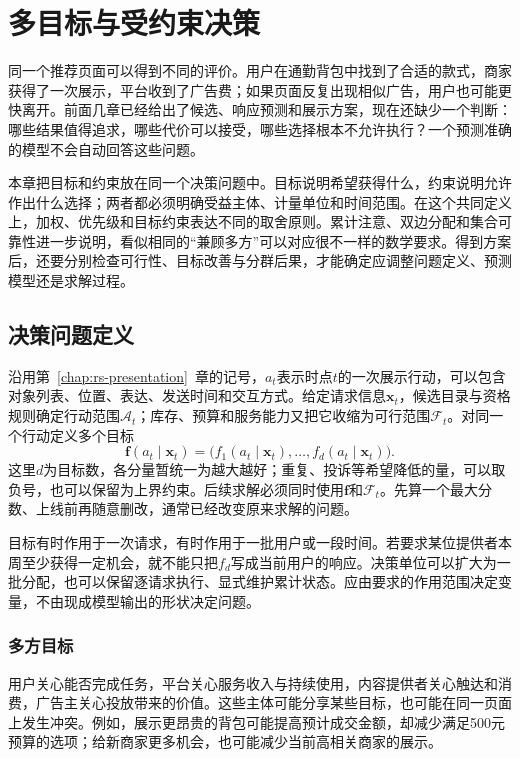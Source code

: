 \chapter{多目标与受约束决策}
\label{chap:rs-constraints}

同一个推荐页面可以得到不同的评价。用户在通勤背包中找到了合适的款式，商家获得了一次展示，平台收到了广告费；如果页面反复出现相似广告，用户也可能更快离开。前面几章已经给出了候选、响应预测和展示方案，现在还缺少一个判断：哪些结果值得追求，哪些代价可以接受，哪些选择根本不允许执行？一个预测准确的模型不会自动回答这些问题。

本章把目标和约束放在同一个决策问题中。目标说明希望获得什么，约束说明允许作出什么选择；两者都必须明确受益主体、计量单位和时间范围。在这个共同定义上，加权、优先级和目标约束表达不同的取舍原则。累计注意、双边分配和集合可靠性进一步说明，看似相同的“兼顾多方”可以对应很不一样的数学要求。得到方案后，还要分别检查可行性、目标改善与分群后果，才能确定应调整问题定义、预测模型还是求解过程。

\section{决策问题定义}
\label{sec:rs-decision-definition}

沿用第~\ref{chap:rs-presentation}~章的记号，$a_t$表示时点$t$的一次展示行动，可以包含对象列表、位置、表达、发送时间和交互方式。给定请求信息$\bm{x}_t$，候选目录与资格规则确定行动范围$\mathcal{A}_t$；库存、预算和服务能力又把它收缩为可行范围$\mathcal{F}_t$。对同一个行动定义多个目标
\[
 \bm{f}(a_t\mid\bm{x}_t)
 =\bigl(f_1(a_t\mid\bm{x}_t),\ldots,
        f_d(a_t\mid\bm{x}_t)\bigr).
\]
这里$d$为目标数，各分量暂统一为越大越好；重复、投诉等希望降低的量，可以取负号，也可以保留为上界约束。后续求解必须同时使用$\bm{f}$和$\mathcal{F}_t$。先算一个最大分数、上线前再随意删改，通常已经改变原来求解的问题。

目标有时作用于一次请求，有时作用于一批用户或一段时间。若要求某位提供者本周至少获得一定机会，就不能只把$f_d$写成当前用户的响应。决策单位可以扩大为一批分配，也可以保留逐请求执行、显式维护累计状态。应由要求的作用范围决定变量，不由现成模型输出的形状决定问题。

\subsection{多方目标}
\label{sec:rs-multistakeholder-objectives}

用户关心能否完成任务，平台关心服务收入与持续使用，内容提供者关心触达和消费，广告主关心投放带来的价值。这些主体可能分享某些目标，也可能在同一页面上发生冲突。例如，展示更昂贵的背包可能提高预计成交金额，却减少满足500元预算的选项；给新商家更多机会，也可能减少当前高相关商家的展示。

